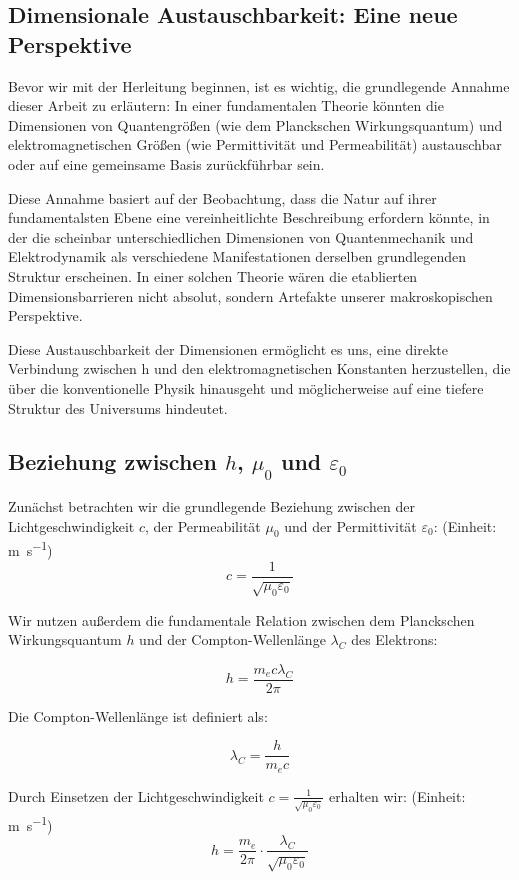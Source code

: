 \documentclass{article}
\begin{document}
	\subsection{Dimensionale Austauschbarkeit: Eine neue Perspektive}
	
	Bevor wir mit der Herleitung beginnen, ist es wichtig, die grundlegende Annahme dieser Arbeit zu erläutern: In einer fundamentalen Theorie könnten die Dimensionen von Quantengrößen (wie dem Planckschen Wirkungsquantum) und elektromagnetischen Größen (wie Permittivität und Permeabilität) austauschbar oder auf eine gemeinsame Basis zurückführbar sein.
	
	Diese Annahme basiert auf der Beobachtung, dass die Natur auf ihrer fundamentalsten Ebene eine vereinheitlichte Beschreibung erfordern könnte, in der die scheinbar unterschiedlichen Dimensionen von Quantenmechanik und Elektrodynamik als verschiedene Manifestationen derselben grundlegenden Struktur erscheinen. In einer solchen Theorie wären die etablierten Dimensionsbarrieren nicht absolut, sondern Artefakte unserer makroskopischen Perspektive.
	
	Diese Austauschbarkeit der Dimensionen ermöglicht es uns, eine direkte Verbindung zwischen h und den elektromagnetischen Konstanten herzustellen, die über die konventionelle Physik hinausgeht und möglicherweise auf eine tiefere Struktur des Universums hindeutet.
	
	\subsection{Beziehung zwischen $h$, $\mu_0$ und $\varepsilon_0$}
	
	Zunächst betrachten wir die grundlegende Beziehung zwischen der Lichtgeschwindigkeit $c$, der Permeabilität $\mu_0$ und der Permittivität $\varepsilon_0$:
	(Einheit: \si{\meter\per\second})	
	$$c = \frac{1}{\sqrt{\mu_0\varepsilon_0}}$$
	
	Wir nutzen außerdem die fundamentale Relation zwischen dem Planckschen Wirkungsquantum $h$ und der Compton-Wellenlänge $\lambda_C$ des Elektrons:
	
	$$h = \frac{m_e c \lambda_C}{2\pi}$$
	
	Die Compton-Wellenlänge ist definiert als:
	
	$$\lambda_C = \frac{h}{m_e c}$$
	
	Durch Einsetzen der Lichtgeschwindigkeit $c = \frac{1}{\sqrt{\mu_0\varepsilon_0}}$ erhalten wir:
	(Einheit: \si{\meter\per\second})	
	$$h = \frac{m_e}{2\pi} \cdot \frac{\lambda_C}{\sqrt{\mu_0\varepsilon_0}}$$
	
\end{document}
